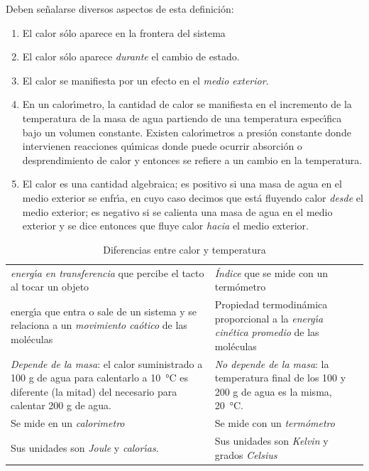 Deben se\~nalarse diversos aspectos de esta definici\'on:
\begin{enumerate}
\item El calor s\'olo aparece en la frontera del sistema
\item El calor s\'olo aparece \textit{durante} el cambio de estado.
\item El calor se manifiesta por un efecto en el \textit{medio exterior}.
\item En un calor\'{\i}metro, la cantidad de calor se manifiesta en el incremento de la temperatura de la masa de agua  partiendo de una temperatura espec\'{\i}fica bajo un volumen constante. Existen calor\'{\i}metros a presi\'on constante donde intervienen reacciones qu\'{\i}micas donde puede ocurrir absorci\'on o desprendimiento de calor y entonces se refiere a un cambio en la temperatura.  
\item El calor es una cantidad algebraica; es positivo si una masa de agua en el medio exterior se enfr\'{\i}a, en cuyo caso decimos que est\'a fluyendo calor \textit{desde} el medio exterior; es negativo  si se calienta una masa de agua en el medio exterior y se dice entonces que fluye calor \textit{hacia} el medio exterior.
\end{enumerate}

\begin{table}[ht]
\caption{Diferencias entre calor y temperatura}
\label{tab:2}
\begin{center}
{\small \begin{tabularx}{.9\linewidth}{XX} \hline
   \hskip .7in \textbf{Calor}& \hskip .4in   
\textbf{Temperatura}\\  \hline
\textit{energ\'{\i}a en transferencia} que  percibe el tacto al tocar un objeto 
 & \textit{\'Indice} que se mide con un term\'ometro\\ 
 
energ\'{\i}a que entra o sale de un sistema y se relaciona a un \textit{movimiento ca\'otico}
de las mol\'eculas&
 Propiedad termodin\'amica  proporcional a la \textit{energ\'{\i}a} \textit{cin\'etica
promedio} de las mol\'eculas\\ 
\textit{Depende de la masa}: el calor suministrado a 100 g de agua para calentarlo a
\SI{10}{\celsius} es diferente (la mitad) del necesario para calentar 200 g de agua. &\textit{No depende de
la masa}: la temperatura final de los 100 y 200 g de agua es la misma, \SI{20}{\celsius}. \\ 
Se mide en un \textit{\gls{calorimetro}} \index{calor\'{\i}metro}&Se mide con un
\textit{term\'ometro} \index{term\'ometro}\\
Sus unidades son \textit{Joule} y \textit{calor\'{\i}as.} &
 Sus unidades son \textit{Kelvin} y grados \textit{Celsius}\\ \hline
\end{tabularx}}
\end{center}
\end{table}

